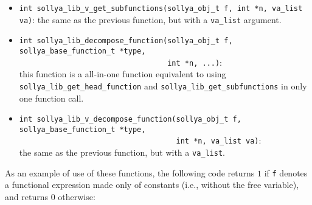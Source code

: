 \documentclass[a4paper]{article}
\newcommand{\sollya}{\texttt{Sollya}\xspace}
\begin{document}
\begin{itemize}
  \begin{itemize}
  \item If $f_0$ is a library function, a \sollya object corresponding to the expression $f_0(x)$ is stored at the address referred to by \texttt{g\_t}. This allows the user to get a \sollya object corresponding to function $f_0$. This object can further be used to evaluate $f_0$ at points or to build new expressions involving $f_0$. Please notice that a library function object is not necessarily the result of a call to the \verb|library| command: it can also be, e.g., the derivative of a function created by a call to \verb|library|.
  \item If $f_0$ is a procedure function, a \sollya object corresponding to the expression $f_0(x)$ is stored at the address referred to by \texttt{g\_t}. The same remarks as above apply.
  \item If $f_0$ is a library constant, $f_0$ itself is stored at the address referred to by \texttt{g\_t}. In this particular case, $t=1$ and the object referred to by \texttt{g\_t} simply gets a copy of \texttt{f}. This (somehow useless) mechanism is made only to handle the cases of library functions, procedure functions and library constants in a unified way.
  \end{itemize}
Please note that the objects that have been stored in variables \texttt{g\_i} must manually be cleared once they become useless.

\item \verb|int sollya_lib_v_get_subfunctions(sollya_obj_t f, int *n, va_list va)|: the same as the previous function, but with a \texttt{va\_list} argument.
\item \verb|int sollya_lib_decompose_function(sollya_obj_t f, sollya_base_function_t *type,|\\
      \verb|                                  int *n, ...)|:\\
this function is a all-in-one function equivalent to using \verb|sollya_lib_get_head_function| and \verb|sollya_lib_get_subfunctions| in only one function call.
\item \verb|int sollya_lib_v_decompose_function(sollya_obj_t f, sollya_base_function_t *type,|\\
      \verb|                                    int *n, va_list va)|:\\
the same as the previous function, but with a \texttt{va\_list}.
\end{itemize}

As an example of use of these functions, the following code returns $1$ if \texttt{f} denotes a functional expression made only of constants (i.e., without the free variable), and returns $0$ otherwise:
\end{document}
